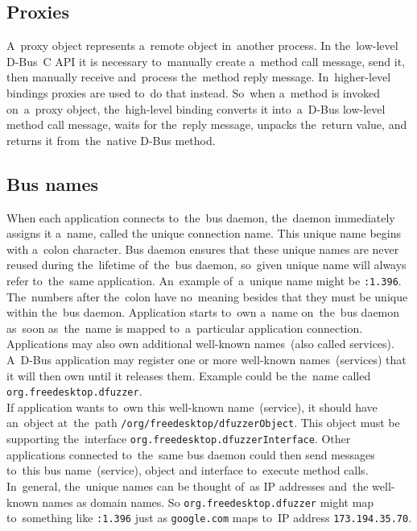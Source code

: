 \subsection{Proxies}
A~proxy object represents a~remote object in~another process. In the~low-level
D-Bus~C API it is necessary to~manually create a~method call message, send it,
then manually receive and~process the~method reply message.
In~higher-level bindings proxies are used to~do that instead.
So~when a~method is invoked on~a~proxy object, the~high-level binding converts it
into~a~D-Bus low-level method call message, waits for the~reply message, unpacks
the~return value, and returns it from~the~native D-Bus method.

\subsection{Bus names}
When each application connects to~the~bus daemon, the~daemon immediately assigns
it a~name, called the unique connection name. This unique name begins with a~colon
character. Bus daemon ensures that these unique names are never reused during
the~lifetime of~the~bus daemon, so~given unique name will always refer to~the~same
application. An~example of~a~unique name might be \texttt{:1.396}. The~numbers
after the~colon have no~meaning besides that they must be unique within the~bus
daemon. Application starts to~own a~name on~the~bus daemon as~soon as~the~name
is mapped to~a~particular application connection.\\

Applications may also own additional well-known names~(also called services).
A~\mbox{D-Bus} application may register one or more well-known names~(services)
that it will then own until it releases them. Example could be the~name called
\texttt{org.freedesktop.dfuzzer}.\\If application wants to~own this well-known
name~(service), it should have an~object at~the~path
\texttt{/org/freedesktop/dfuzzerObject}. This object must be supporting
the~interface \texttt{org.freedesktop.dfuzzerInterface}. Other applications
connected to~the~same bus daemon could then send messages to~this bus
name~(service), object and interface to~execute method calls.\\

In~general, the~unique names can be thought of~as IP addresses and~the well-known
names as domain names. So \texttt{org.freedesktop.dfuzzer} might map to~something
like \texttt{:1.396} just as \texttt{google.com} maps to~IP address
\texttt{173.194.35.70}.\\


